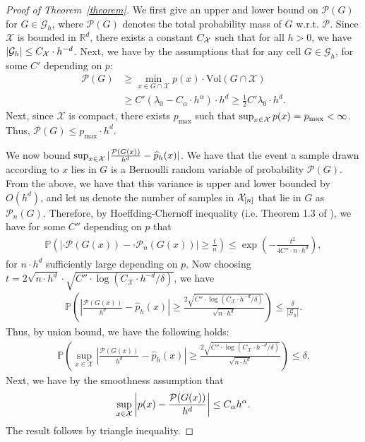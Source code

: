\begin{proof}[Proof of Theorem~\ref{theorem}]
We first give an upper and lower bound on $\mathcal{P}(G)$ for $G \in \mathcal{G}_h$, where $\mathcal{P}(G)$ denotes the total probability mass of $G$ w.r.t. $\mathcal{P}$.
Since $\mathcal{X}$ is bounded in $\mathbb{R}^d$, there exists a constant $C_{\mathcal{X}}$ such that for all $h > 0$, we have $|\mathcal{G}_h| \le C_{\mathcal{X}} \cdot h^{-d}$.
Next, we have by the assumptions that for any cell $G \in \mathcal{G}_h$, for some $C'$ depending on $p$:
\begin{align*}
    \mathcal{P}(G) &\ge \min_{x \in G\cap \mathcal{X}} p(x) \cdot \text{Vol}(G \cap \mathcal{X})\\
    &\ge C' (\lambda_0 - C_\alpha\cdot h^\alpha)\cdot h^d \ge \frac{1}{2} C' \lambda_0 \cdot h^d.
\end{align*}
Next, since $\mathcal{X}$ is compact, there exists $p_{\text{max}}$ such that $\sup_{x\in\mathcal{X}} p(x) = p_{\text{max}} < \infty$. Thus,
$\mathcal{P}(G)\le  p_{\text{max}}\cdot h^d$.


We now bound $\sup_{x \in \mathcal{X}} |\frac{\mathcal{P}(G(x))}{h^d} - \widehat{p}_h(x)|$. We have that the event a sample drawn according to $x$ lies in $G$ is a Bernoulli random variable of probability $\mathcal{P}(G)$. From the above, we have that this variance is upper and lower bounded by $O(h^{d})$, and let us denote the number of samples in $\mathcal{X}_{[n]}$ that lie in $G$ as $\mathcal{P}_n(G)$. 
Therefore, by Hoeffding-Chernoff inequality (i.e. Theorem 1.3 of \cite{phillips2012chernoff}), we have for some $C''$ depending on $p$ that
\begin{align*}
    \mathbb{P}\left(\left|\cdot \mathcal{P}(G(x)) - \cdot \mathcal{P}_n(G(x))\right| \ge \frac{t}{n}\right) \le \exp\left(-\frac{t^2}{4C''\cdot n\cdot h^d}\right),
\end{align*}
for $n \cdot h^d$ sufficiently large depending on $p$.
Now choosing $t = 2\sqrt{n\cdot h^d}\cdot \sqrt{  C''\cdot\log(C_\mathcal{X}\cdot h^{-d}/\delta)}$, we have
\begin{align*}
    \mathbb{P}\left(\left|\frac{\mathcal{P}(G(x))}{h^d} - \widehat{p}_h(x)\right| \ge \frac{2\sqrt{C''\cdot \log( C_\mathcal{X}\cdot h^{-d}/\delta)}}{\sqrt{n\cdot h^d}}\right) \le \frac{\delta}{|\mathcal{G}_h|}.
\end{align*}
Thus, by union bound, we have the following holds:
\begin{align*}
    \mathbb{P}\left(\sup_{x\in \mathcal{X}}\left|\frac{\mathcal{P}(G(x))}{h^d} - \widehat{p}_h(x)\right| \ge \frac{2\sqrt{C''\cdot\log( C_\mathcal{X}\cdot h^{-d}/\delta)}}{\sqrt{n\cdot h^d}}\right) \le \delta.
\end{align*}
Next, we have by the smoothness assumption that
\begin{align*}
    \sup_{x\in \mathcal{X}} \left|p(x) - \frac{\mathcal{P}(G(x))}{h^d} \right| \le C_\alpha h^\alpha.
\end{align*}
The result follows by triangle inequality.
\end{proof}
